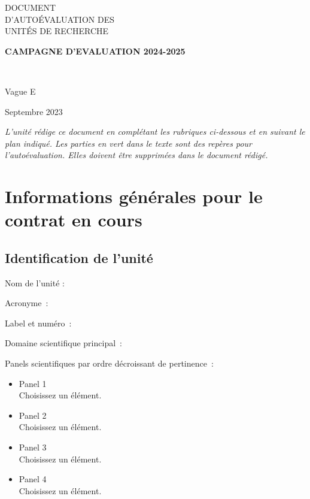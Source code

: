 \documentclass[]{article}
\providecommand{\tightlist}{%
  \setlength{\itemsep}{0pt}\setlength{\parskip}{0pt}}
\newcommand{\instructions}[1]{{\em \color{hceresgreen}#1}}
\begin{document}
\begin{titlepage}
\begin{tcolorbox}[standard jigsaw, opacityback=0, opacityframe=0,boxsep=.7cm,left skip=4cm, right skip=-4cm, before skip=5cm]
{\color{hcerespurple}\LARGE DOCUMENT\\
D'AUTOÉVALUATION DES\\
UNITÉS DE RECHERCHE}


\vskip 2cm
{\raggedright\color{hceresred}\bf\large CAMPAGNE D'EVALUATION 2024-2025
}\\
{\raggedright\color{hceresred}\large Vague E
}
\par\vskip 2cm
{\raggedright\color{hcerespurple}\large Septembre 2023}

\par
\end{tcolorbox}

\date{Septembre 2023}
\end{titlepage}


\instructions{L’unité rédige ce document en complétant les rubriques ci-dessous et en suivant le plan indiqué. Les parties en vert dans le texte sont des repères pour l’autoévaluation. Elles doivent être supprimées dans le document rédigé.}

\section{Informations générales pour le contrat en cours}

\subsection{Identification de l'unité}

Nom de l'unité :

Acronyme~:

Label et numéro~:

Domaine scientifique principal~:

Panels scientifiques par ordre décroissant de pertinence~:

\begin{itemize}
\tightlist
\item
  Panel 1\\
  Choisissez un élément.
\item
  Panel 2\\
  Choisissez un élément.
\item
  Panel 3\\
  Choisissez un élément.
\item
  Panel 4\\
  Choisissez un élément.
\end{itemize}
\end{document}
